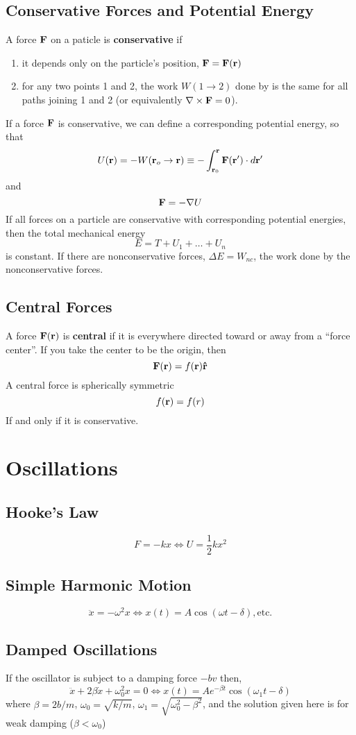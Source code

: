 \documentclass{article}
\newcommand{\uvec}[1]{\boldsymbol{\hat{\textbf{#1}}}}
\begin{document}
\subsection*{Conservative Forces and Potential Energy}
A force $\vb{F}$ on a paticle is \textbf{conservative} if 
\begin{enumerate}
    \item it depends only on the particle's position, $\vb{F} = \vb{F(r)}$
    \item for any two points 1 and 2, the work $W(1\to2)$ done by  is the same for all paths joining 1 and 2 (or equivalently $\nabla \times \vb{F} = 0$).
\end{enumerate}
If a force $\vb{F}$ is conservative, we can define a corresponding potential energy, so that
$$
U(\vb{r}) = -W(\vb{r}_o \to \vb{r}) \equiv -\int_{\vb{r}_{0}}^{\vb{r}} \vb{F(r')} \cdot d\vb{r'}
$$
and
$$
\vb{F} = -\nabla U
$$
If all forces on a particle are conservative with corresponding potential energies, then the total mechanical energy
$$
E = T + U_1 + \dots + U_n
$$
is constant.  If there are nonconservative forces, $\Delta E = W_{nc}$, the work done by the nonconservative forces.
\subsection*{Central Forces}
A force $\vb{F(r)}$ is \textbf{central} if it is everywhere directed toward or away from a ``force center''. If you take the center to be the origin, then
$$
\vb{F(r)} = f(\vb{r})\uvec{r}
$$
A central force is spherically symmetric 
$$
f(\vb{r}) = f(r)
$$
If and only if it is conservative.

\section{Oscillations}
\subsection*{Hooke's Law}
$$F = -kx \iff U = \frac{1}{2}kx^2$$
\subsection*{Simple Harmonic Motion}
$$
\ddot{x} = -\omega^2 x \iff x(t) = A\cos(\omega t - \delta), \text{etc.}
$$
\subsection*{Damped Oscillations}
If the oscillator is subject to a damping force $-bv$ then,
$$
\ddot{x} + 2\beta \dot{x} + \omega_0^2 x = 0 \iff x(t) = Ae^{-\beta t} \cos(\omega_1 t-\delta)
$$
where $\beta = 2b/m$, $\omega_0 = \sqrt{k/m}$, $\omega_1 = \sqrt{\omega_0^2 - \beta^2}$, and the solution given here is for weak damping ($\beta < \omega_0$)
\end{document}
